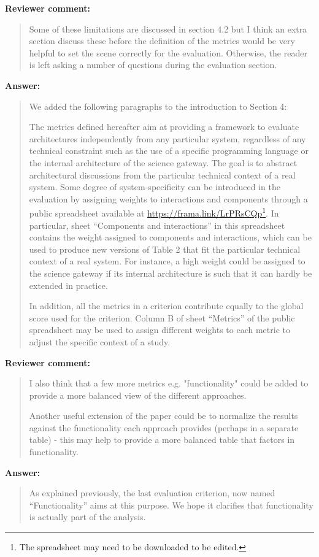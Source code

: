 \documentclass[a4]{article}
\newenvironment{review}%
{\textbf{Reviewer comment:}\begin{quote}}%
{\end{quote}}%
\newenvironment{answer}%
{\textbf{Answer:}\begin{small}\begin{quote}}%
{\end{quote}\end{small}}%
\newcommand{\revised}[1]{\color{blue} #1\color{black}\xspace}
\begin{document}
\begin{review}
Some of these limitations are discussed in section 4.2 but I think an
extra section discuss these before the definition of the metrics would
be very helpful to set the scene correctly for the
evaluation.  Otherwise, the reader is left asking a number of questions
during the evaluation section. 
\end{review}

\begin{answer}
We added the following paragraphs to the introduction to Section 4:

\revised{The metrics defined hereafter aim at providing a framework
  to evaluate architectures independently from any particular system,
  regardless of any technical constraint such as the use of a specific
  programming language or the internal architecture of the science
  gateway. The goal is to abstract architectural discussions from the
  particular technical context of a real system. Some degree of
  system-specificity can be introduced in the evaluation by assigning
  weights to interactions and components through a public spreadsheet
  available at \url{https://frama.link/LrPRsCQp}\footnote{The
    spreadsheet may need to be downloaded to be edited.}. In
  particular, sheet ``Components and interactions'' in this
  spreadsheet contains the weight assigned to components and
  interactions, which can be used to produce new versions of
  Table 2 that fit the particular technical
  context of a real system. For instance, a high weight could be
  assigned to the science gateway if its internal architecture is such
  that it can hardly be extended in practice.

  In addition, all the metrics in a criterion contribute
  equally to the global score used for the criterion. Column B of
  sheet ``Metrics'' of the public spreadsheet may be used to assign
  different weights to each metric to adjust the specific context of a
  study.
}
\end{answer}

\begin{review}
I also think that a few more metrics
e.g. "functionality" could be added to provide a more balanced view of
the different approaches.

 Another useful extension of the paper could
be to normalize the results against the functionality each approach
provides (perhaps in a separate table) - this may help to provide a
more balanced table that factors in functionality.
\end{review}

\begin{answer}
  As explained previously, the last evaluation criterion, now named
  ``Functionality'' aims at this purpose. We hope it clarifies that
  functionality is actually part of the analysis. 
\end{answer}
\end{document}
